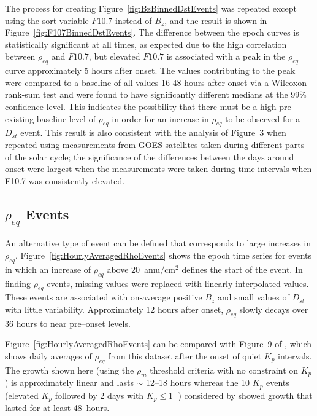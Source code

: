 \documentclass[draft,linenumbers]{agujournal}
\begin{document}

The process for creating Figure~\ref{fig:BzBinnedDstEvents} was repeated except using the sort variable $F10.7$ instead of $B_z$, and the result is shown in Figure~\ref{fig:F107BinnedDstEvents}. The difference between the epoch curves is statistically significant at all times, as expected due to the high correlation between $\rho_{eq}$ and $F10.7$, but elevated $F10.7$ is associated with a peak in the $\rho_{eq}$ curve approximately 5 hours after onset. The values contributing to the peak were compared to a baseline of all values 16-48 hours after onset via a Wilcoxon rank-sum test and were found to have significantly different medians at the 99\% confidence level.  This indicates the possibility that there must be a high pre-existing baseline level of $\rho_{eq}$ in order for an increase in $\rho_{eq}$ to be observed for a $D_{st}$ event.  This result is also consistent with the analysis of Figure~3 when repeated using measurements from GOES satellites taken during different parts of the solar cycle; the significance of the differences between the days around onset were largest when the measurements were taken during time intervals when F10.7 was consistently elevated.

\subsection{$\rho_{eq}$ Events}

An alternative type of event can be defined that corresponds to large increases in $\rho_{eq}$.  Figure~\ref{fig:HourlyAveragedRhoEvents} shows the epoch time series for events in which an increase of $\rho_{eq}$ above $20$~amu/cm$^2$ defines the start of the event. In finding $\rho_{eq}$ events, missing values were replaced with linearly interpolated values.  These events are associated with on-average positive $B_z$ and small values of $D_{st}$ with little variability.  Approximately 12 hours after onset, $\rho_{eq}$ slowly decays over 36 hours to near pre--onset levels.  

Figure~\ref{fig:HourlyAveragedRhoEvents} can be compared with Figure~9 of \citet{Denton2016}, which shows daily averages of $\rho_{eq}$ from this dataset after the onset of quiet $K_p$ intervals.  The growth shown here (using the $\rho_m$ threshold criteria with no constraint on $K_p$) is approximately linear and lasts $\sim$ 12--18 hours whereas the 10 $K_p$ events (elevated $K_p$ followed by 2 days with $K_p \le 1^+$) considered by \citet{Denton2016} showed growth that lasted for at least 48~hours. 
\end{document}
